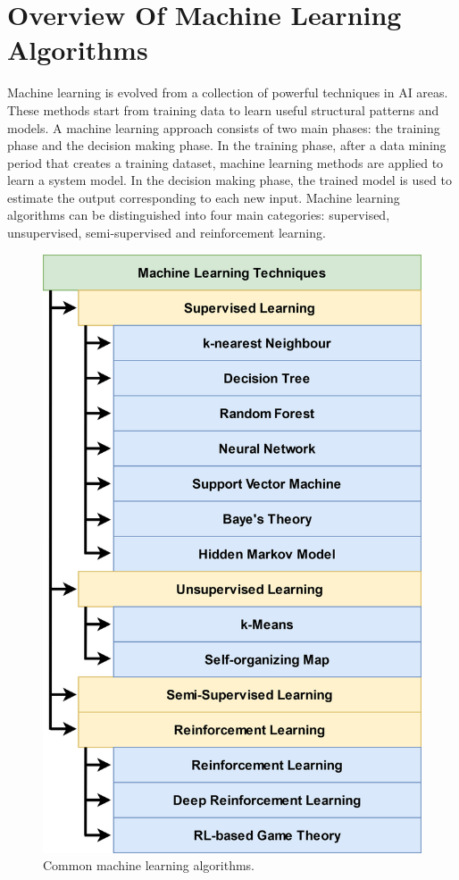 \section{Overview Of Machine Learning Algorithms} \label{sec:ML_BGK}
Machine learning is evolved from a collection of powerful techniques in AI areas. These methods start from training data to learn useful structural patterns and models. A machine learning approach consists of two main phases: the training phase and the decision making phase. In the training phase, after a data mining period that creates a training dataset, machine learning methods are applied to learn a system model. In the decision making phase, the trained model is used to estimate the output corresponding to each new input.
Machine learning algorithms can be distinguished into four main categories: supervised, unsupervised, semi-supervised and reinforcement learning.
\begin{figure}[tb!]
	\centering
	\includegraphics[scale=0.13]{figure/ML_algo.jpg}
	\caption{Common machine learning algorithms.}
	\label{fig:{ML_algo}}
\end{figure}
